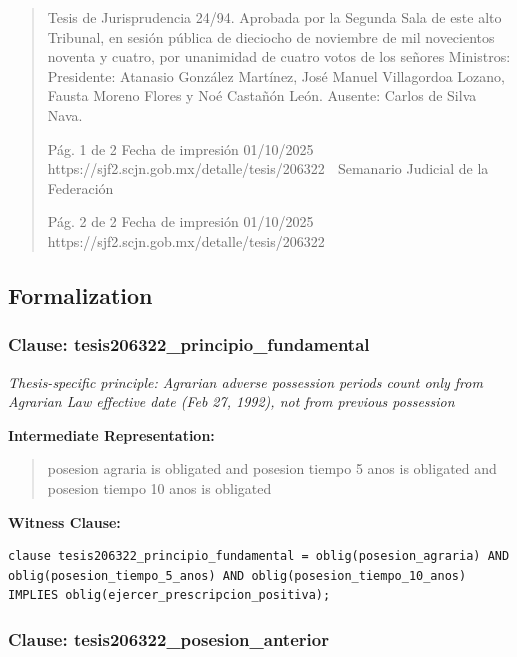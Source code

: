 \documentclass[11pt,a4paper]{article}
\begin{document}
\begin{quote}
Tesis de Jurisprudencia 24/94. Aprobada por la Segunda Sala de este alto Tribunal, en sesión
pública de dieciocho de noviembre de mil novecientos noventa y cuatro, por unanimidad de cuatro
votos de los señores Ministros: Presidente: Atanasio González Martínez, José Manuel Villagordoa
Lozano, Fausta Moreno Flores y Noé Castañón León. Ausente: Carlos de Silva Nava.




                                              Pág. 1 de 2              Fecha de impresión 01/10/2025
  https://sjf2.scjn.gob.mx/detalle/tesis/206322
                                                Semanario Judicial de la Federación




                                           Pág. 2 de 2       Fecha de impresión 01/10/2025
https://sjf2.scjn.gob.mx/detalle/tesis/206322

\end{quote}

\subsection{Formalization}

\subsubsection{Clause: tesis206322\_principio\_fundamental}

\textit{Thesis-specific principle: Agrarian adverse possession periods count only from Agrarian Law effective date (Feb 27, 1992), not from previous possession}

\textbf{Intermediate Representation:}

\begin{quote}
posesion agraria is obligated and posesion tiempo 5 anos is obligated and posesion tiempo 10 anos is obligated
\end{quote}

\textbf{Witness Clause:}

\begin{lstlisting}[style=witnessstyle, language=Witness]
clause tesis206322_principio_fundamental = oblig(posesion_agraria) AND oblig(posesion_tiempo_5_anos) AND oblig(posesion_tiempo_10_anos) IMPLIES oblig(ejercer_prescripcion_positiva);
\end{lstlisting}

\subsubsection{Clause: tesis206322\_posesion\_anterior}
\end{document}
